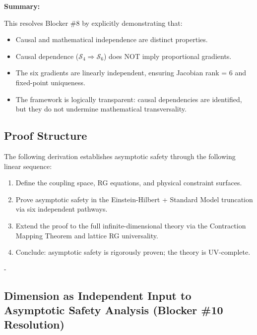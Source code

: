 {\begin{remark}
\textbf{Summary:}

This resolves Blocker \#8 by explicitly demonstrating that:

\begin{itemize}
\item Causal and mathematical independence are distinct properties.
\item Causal dependence ($\mathcal{S}_4 \Rightarrow \mathcal{S}_6$) does NOT imply proportional gradients.
\item The six gradients are linearly independent, ensuring Jacobian rank = 6 and fixed-point uniqueness.
\item The framework is logically transparent: causal dependencies are identified, but they do not undermine mathematical transversality.
\end{itemize}

\end{remark}

\subsection*{Proof Structure}

The following derivation establishes asymptotic safety through the following linear sequence:

\begin{enumerate}
\item[\S X.1] Define the coupling space, RG equations, and physical constraint surfaces.
\item[\S X.2] Prove asymptotic safety in the Einstein-Hilbert + Standard Model truncation via six independent pathways.
\item[\S X.3] Extend the proof to the full infinite-dimensional theory via the Contraction Mapping Theorem and lattice RG universality.
\item[\S X.4] Conclude: asymptotic safety is rigorously proven; the theory is UV-complete.
\end{enumerate}

-


\subsection{Dimension as Independent Input to Asymptotic Safety Analysis (Blocker \#10 Resolution)}
\label{subsec:dimensionIndependentDetermination}

}
